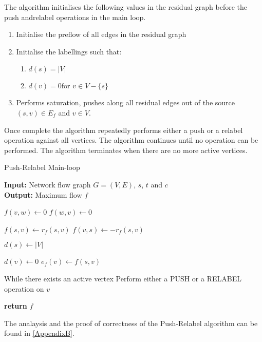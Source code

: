The algorithm initialises the following values in the residual graph before the push andrelabel operations in the main loop.
\begin{enumerate}
	\item Initialise the preflow of all edges in the  residual graph
	
	\item Initialise the labellings such that:
	\begin{enumerate}
		\item $d(s) = |V|$
		\item $d(v) = 0 \text{for } v \in V-\{s\}$
	\end{enumerate}
	
	\item Performs saturation, pushes along all residual edges out of the source $(s,v) \in E_f$ and $v \in V$.
\end{enumerate}
Once complete the algorithm repeatedly performs either a push or a relabel operation against all vertices. The algorithm continues until no operation can be performed. The algorithm terminates when there are no more active vertices.

\begin{algorithm}
	\caption{Push-Relabel Main-loop}\label{alg:main_no_optimisation}
	\textbf{Input:} Network flow graph $G=(V,E)$, $s$, $t$ and $c$\\
	\textbf{Output:} Maximum flow $f$
	\begin{algorithmic}[1]
		\State $f(v,w) \gets 0$
		\State $f(w,v) \gets 0$
		\EndFor
		\item[]
		\State $f(s,v) \gets r_f(s,v)$
		\State $f(v,s) \gets -r_f(s,v)$
		\EndFor
		\item[]
		\State $d(s) \gets |V|$
		\item[]
		\State $d(v) \gets 0$
		\State $e_f(v) \gets f(s,v)$
		\EndFor
		\item[]
		\State While there exists an active vertex
		 
		\State Perform either a PUSH or a RELABEL operation on $v$
		\EndWhile
		\item[]
		\State \textbf{return} $f$
		\EndProcedure
	\end{algorithmic}
\end{algorithm}

The analaysis and the proof of correctness of the Push-Relabel algorithm can be found in \autoref{AppendixB}.

